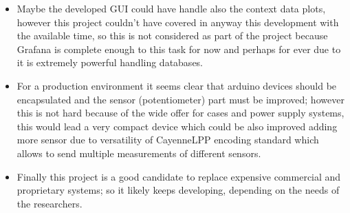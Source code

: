 \documentclass[11pt,a4paper,dvipsnames,twoside]{article}
\begin{document}
\begin{itemize}
    \item Maybe the developed GUI could have handle also the context data plots, however this project couldn't have covered in anyway this development with the available time, so this is not considered as part of the project because Grafana is complete enough to this task for now and perhaps for ever due to it is extremely powerful handling databases.
    \item For a production environment it seems clear that arduino devices should be encapsulated and the sensor (potentiometer) part must be improved; however this is not hard because of the wide offer for cases and power supply systems, this would lead a very compact device which could be also improved adding more sensor due to versatility of CayenneLPP encoding standard which allows to send multiple measurements of different sensors. 
    \item Finally this project is a good candidate to replace expensive commercial and proprietary systems; so it likely keeps developing, depending on the needs of the researchers.
\end{itemize}

\clearpage{\pagestyle{empty}\cleardoublepage}\pagestyle{myfancy} %
\printbibliography
\end{document}
